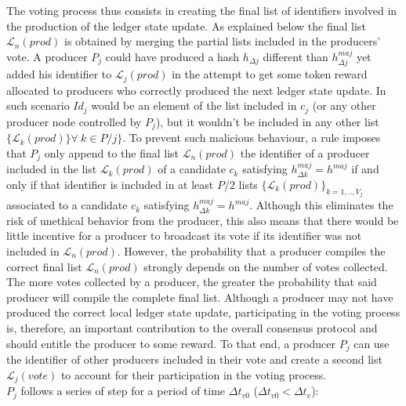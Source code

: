 The voting process thus consists in creating the final list of identifiers involved in the production of the ledger state update. As explained below the final list $\mathcal{L}_n(prod)$ is obtained by merging the partial lists included in the producers' vote. A producer $P_j$ could have produced a hash $h_{\Delta j}$ different than $h^{maj}_{\Delta j}$ yet added his identifier to $\mathcal{L}_j(prod)$ in the attempt to get some token reward allocated to producers who correctly produced the next ledger state update. In such scenario $Id_j$ would be an element of the list included in $c_j$ (or any other producer node controlled by $P_j$), but it wouldn't be included in any other list $\{\mathcal{L}_k(prod)\} \forall~k \in P/j\}$. To prevent such malicious behaviour, a rule imposes that $P_j$ only append to the final list $\mathcal{L}_n(prod)$ the identifier of a producer included in the list $\mathcal{L}_k(prod)$ of a candidate $c_k$ satisfying $h^{maj}_{\Delta k} = h^{maj}$ if and only if that identifier is included in at least $P/2$ lists $\{\mathcal{L}_{k}(prod)\}_{k=1,..,V_j}$ associated to a candidate $c_{k}$ satisfying $h^{maj}_{\Delta k} = h^{maj}$. Although this eliminates the risk of unethical behavior from the producer, this also means that there would be little incentive for a producer to broadcast its vote if its identifier was not included in $\mathcal{L}_n(prod)$. However, the probability that a producer compiles the correct final list $\mathcal{L}_n(prod)$ strongly depends on the number of votes collected. The more votes collected by a producer, the greater the probability that said producer will compile the complete final list. Although a producer may not have produced the correct local ledger state update, participating in the voting process is, therefore, an important contribution to the overall consensus protocol and should entitle the producer to some reward. To that end, a producer $P_j$ can use the identifier of other producers included in their vote and create a second list $\mathcal{L}_j(vote)$ to account for their participation in the voting process. \\
 
$P_j$ follows a series of step for a period of time $\Delta t_{v0}$ ($\Delta t_{v0} < \Delta t_{v}$):

